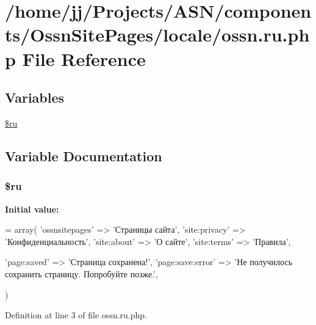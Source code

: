 \hypertarget{components_2_ossn_site_pages_2locale_2ossn_8ru_8php}{}\section{/home/jj/\+Projects/\+A\+S\+N/components/\+Ossn\+Site\+Pages/locale/ossn.ru.\+php File Reference}
\label{components_2_ossn_site_pages_2locale_2ossn_8ru_8php}
\subsection*{Variables}
\begin{DoxyCompactItemize}
\item 
\hyperlink{components_2_ossn_site_pages_2locale_2ossn_8ru_8php_aab84a3feda2b0e489cac7cd194e8d726}{\$ru}
\end{DoxyCompactItemize}


\subsection{Variable Documentation}
\subsubsection[{\texorpdfstring{\$ru}{$ru}}]{\setlength{\rightskip}{0pt plus 5cm}\$ru}\hypertarget{components_2_ossn_site_pages_2locale_2ossn_8ru_8php_aab84a3feda2b0e489cac7cd194e8d726}{}\label{components_2_ossn_site_pages_2locale_2ossn_8ru_8php_aab84a3feda2b0e489cac7cd194e8d726}
{\bfseries Initial value\+:}
\begin{DoxyCode}
= array(
    \textcolor{stringliteral}{'ossnsitepages'} => \textcolor{stringliteral}{'Страницы сайта'},
    \textcolor{stringliteral}{'site:privacy'} => \textcolor{stringliteral}{'Конфиденциальность'},
    \textcolor{stringliteral}{'site:about'} => \textcolor{stringliteral}{'О сайте'},
    \textcolor{stringliteral}{'site:terms'} => \textcolor{stringliteral}{'Правила'},

    \textcolor{stringliteral}{'page:saved'} => \textcolor{stringliteral}{'Страница сохранена!'},
    \textcolor{stringliteral}{'page:save:error'} => \textcolor{stringliteral}{'Не получилось сохранить страницу. Попробуйте позже.'},

)
\end{DoxyCode}


Definition at line 3 of file ossn.\+ru.\+php.


